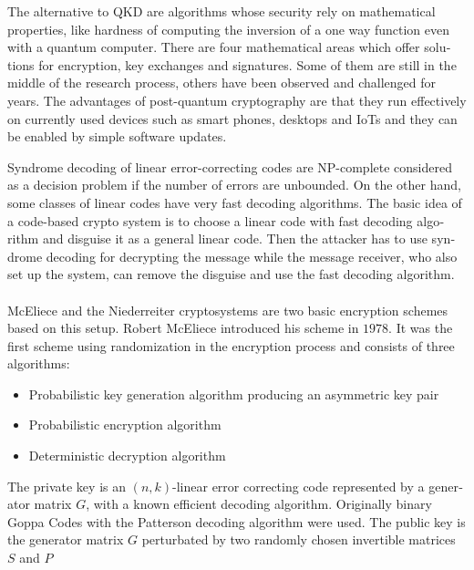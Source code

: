 \documentclass[a4paper,11pt,draft]{article}
\begin{document}
\begin{otherlanguage}{english}
\begin{multicols}{2}
\noindent

The alternative to QKD are algorithms whose security rely on mathematical properties, like hardness of computing the inversion of a one way function even with a quantum computer. There are four mathematical areas which offer solutions for encryption, key exchanges and signatures. Some of them are still in the middle of the research process, others have been observed and challenged for years. The advantages of post-quantum cryptography are that they run effectively on currently used devices such as smart phones, desktops and IoTs and they can be enabled by simple software updates.

Syndrome decoding of linear error-correcting codes are NP-complete considered as a decision problem if the number of errors are unbounded. On the other hand, some classes of linear codes have very fast decoding algorithms. The basic idea of a code-based crypto system is to choose a linear code with fast decoding algorithm and disguise it as a general linear code. Then the attacker has to use syndrome decoding for decrypting the message while the message receiver, who also set up the system, can remove the disguise and use the fast decoding algorithm. \\
\\
McEliece and the Niederreiter cryptosystems are two basic encryption schemes based on this setup. Robert McEliece introduced his scheme in $1978$. It was the first scheme using randomization in the encryption process and consists of three algorithms:

\begin{itemize} [noitemsep, nolistsep]
\item[1)] Probabilistic key generation algorithm producing an asymmetric key pair
\item[2)] Probabilistic encryption algorithm
\item[3)] Deterministic decryption algorithm
\end{itemize} 

\vspace{0.4cm}

The private key is an $(n,k)$-linear error correcting code represented by a generator matrix $G$, with a known efficient decoding algorithm. Originally binary Goppa Codes with the Patterson decoding algorithm were used. The public key is the generator matrix $G$ perturbated by two randomly chosen invertible matrices $S$ and $P$


\end{multicols}
\end{otherlanguage}
\end{document}
